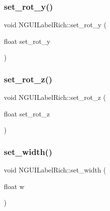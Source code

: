 \subsubsection{\texorpdfstring{set\+\_\+rot\+\_\+y()}{set\_rot\_y()}}
{\footnotesize\ttfamily void N\+G\+U\+I\+Label\+Rich\+::set\+\_\+rot\+\_\+y (\begin{DoxyParamCaption}\item[{float}]{set\+\_\+rot\+\_\+y }\end{DoxyParamCaption})}

\hypertarget{class_n_g_u_i_label_rich_a0474c3ce51fcf511f954df038b6c2aee}{}\label{class_n_g_u_i_label_rich_a0474c3ce51fcf511f954df038b6c2aee} 
\subsubsection{\texorpdfstring{set\+\_\+rot\+\_\+z()}{set\_rot\_z()}}
{\footnotesize\ttfamily void N\+G\+U\+I\+Label\+Rich\+::set\+\_\+rot\+\_\+z (\begin{DoxyParamCaption}\item[{float}]{set\+\_\+rot\+\_\+z }\end{DoxyParamCaption})}

\hypertarget{class_n_g_u_i_label_rich_a0c65edd29c2d14e12484142dcef36d20}{}\label{class_n_g_u_i_label_rich_a0c65edd29c2d14e12484142dcef36d20} 
\subsubsection{\texorpdfstring{set\+\_\+width()}{set\_width()}}
{\footnotesize\ttfamily void N\+G\+U\+I\+Label\+Rich\+::set\+\_\+width (\begin{DoxyParamCaption}\item[{float}]{w }\end{DoxyParamCaption})}

\hypertarget{class_n_g_u_i_label_rich_a189517226a3276fbe1398327fd5a0250}{}\label{class_n_g_u_i_label_rich_a189517226a3276fbe1398327fd5a0250} 
